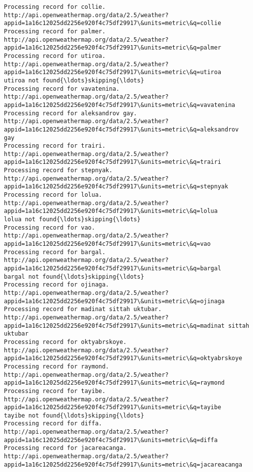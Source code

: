 \documentclass[11pt]{article}
\begin{document}
\begin{Verbatim}[commandchars=\\\{\}]
Processing record for collie.
http://api.openweathermap.org/data/2.5/weather?appid=1a16c12025dd2256e920f4c75df29917\&units=metric\&q=collie
Processing record for palmer.
http://api.openweathermap.org/data/2.5/weather?appid=1a16c12025dd2256e920f4c75df29917\&units=metric\&q=palmer
Processing record for utiroa.
http://api.openweathermap.org/data/2.5/weather?appid=1a16c12025dd2256e920f4c75df29917\&units=metric\&q=utiroa
utiroa not found{\ldots}skipping{\ldots}
Processing record for vavatenina.
http://api.openweathermap.org/data/2.5/weather?appid=1a16c12025dd2256e920f4c75df29917\&units=metric\&q=vavatenina
Processing record for aleksandrov gay.
http://api.openweathermap.org/data/2.5/weather?appid=1a16c12025dd2256e920f4c75df29917\&units=metric\&q=aleksandrov gay
Processing record for trairi.
http://api.openweathermap.org/data/2.5/weather?appid=1a16c12025dd2256e920f4c75df29917\&units=metric\&q=trairi
Processing record for stepnyak.
http://api.openweathermap.org/data/2.5/weather?appid=1a16c12025dd2256e920f4c75df29917\&units=metric\&q=stepnyak
Processing record for lolua.
http://api.openweathermap.org/data/2.5/weather?appid=1a16c12025dd2256e920f4c75df29917\&units=metric\&q=lolua
lolua not found{\ldots}skipping{\ldots}
Processing record for vao.
http://api.openweathermap.org/data/2.5/weather?appid=1a16c12025dd2256e920f4c75df29917\&units=metric\&q=vao
Processing record for bargal.
http://api.openweathermap.org/data/2.5/weather?appid=1a16c12025dd2256e920f4c75df29917\&units=metric\&q=bargal
bargal not found{\ldots}skipping{\ldots}
Processing record for ojinaga.
http://api.openweathermap.org/data/2.5/weather?appid=1a16c12025dd2256e920f4c75df29917\&units=metric\&q=ojinaga
Processing record for madinat sittah uktubar.
http://api.openweathermap.org/data/2.5/weather?appid=1a16c12025dd2256e920f4c75df29917\&units=metric\&q=madinat sittah uktubar
Processing record for oktyabrskoye.
http://api.openweathermap.org/data/2.5/weather?appid=1a16c12025dd2256e920f4c75df29917\&units=metric\&q=oktyabrskoye
Processing record for raymond.
http://api.openweathermap.org/data/2.5/weather?appid=1a16c12025dd2256e920f4c75df29917\&units=metric\&q=raymond
Processing record for tayibe.
http://api.openweathermap.org/data/2.5/weather?appid=1a16c12025dd2256e920f4c75df29917\&units=metric\&q=tayibe
tayibe not found{\ldots}skipping{\ldots}
Processing record for diffa.
http://api.openweathermap.org/data/2.5/weather?appid=1a16c12025dd2256e920f4c75df29917\&units=metric\&q=diffa
Processing record for jacareacanga.
http://api.openweathermap.org/data/2.5/weather?appid=1a16c12025dd2256e920f4c75df29917\&units=metric\&q=jacareacanga

\end{Verbatim}
\end{document}
